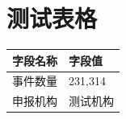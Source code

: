 \documentclass{ctexart}
\newcommand{\fieldvalue}[1]{#1}
\begin{document}
\section*{测试表格}

\begin{tabularx}{\textwidth}{|p{3cm}|X|}
\hline
字段名称 & 字段值 \\
\hline
事件数量 &
\fieldvalue{231,314} \\
\hline
申报机构 &
\fieldvalue{测试机构} \\
\hline
\end{tabularx}

\end{document}
